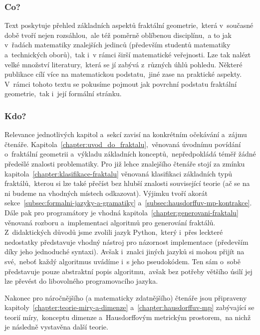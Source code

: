 \label{chapter:predmluva}

\subsubsection{Co?}

Text poskytuje přehled základních aspektů fraktální geometrie,~která v~současné době tvoří nejen rozsáhlou,~ale též poměrně oblíbenou disciplínu,~a to jak v~řadách matematiky znalejších jedinců (především studentů matematiky a~technických oborů),~tak i~v rámci širší matematické veřejnosti. Lze tak nalézt velké množství literatury,~která se jí zabývá z~různých úhlů pohledu. Některé publikace cílí více na matematickou podstatu,~jiné zase na praktické aspekty. V~rámci tohoto textu se pokusíme pojmout jak povrchní podstatu fraktální geometrie,~tak i~její formální stránku.

\subsubsection{Kdo?}

Relevance jednotlivých kapitol a~sekcí zavisí na konkrétním očekávání a~zájmu čtenáře. Kapitola~\ref{chapter:uvod_do_fraktalu},~věnovaná úvodnímu povídání o~fraktální geometrii a~výkladu základních konceptů,~nepředpokládá téměř žádné předešlé znalosti problematiky. Pro již lehce znalejšího čtenáře stojí za zmínku kapitola~\ref{chapter:klasifikace-fraktalu} věnovaná klasifikaci základních typů fraktálů,~kterou si lze také přečíst bez hlubší znalosti související teorie (ač se na ni budeme na vhodných místech odkazovat). Výjimku tvoří akorát sekce~\ref{subsec:formalni-jazyky-a-gramatiky} a~\ref{subsec:hausdorffuv-mp-kontrakce}. Dále pak pro programátory je vhodná kapitola~\ref{chapter:generovani-fraktalu} věnovaná rozboru a~implementaci algoritmů pro generování fraktálů. Z~didaktických důvodů jsme zvolili jazyk Python,~který i~přes leckteré nedostatky představuje vhodný nástroj pro názornost implementace (především díky jeho jednoduché syntaxi). Avšak i~znalci jiných jazyků si mohou přijít na své,~neboť každý algoritmus uvádíme i~s jeho pseudokódem. Ten sám o~sobě představuje pouze abstraktní popis algoritmu,~avšak bez potřeby většího úsilí jej lze převést do libovolného programovacího jazyka.

Nakonec pro náročnějšího (a matematicky zdatnějšího) čtenáře jsou připraveny kapitoly~\ref{chapter:teorie-miry-a-dimenze} a~\ref{chapter:hausdorffuv-mp} zabývající se teorií míry,~konceptu dimenze a~Hausdorffovým metrickým prostorem,~na nichž je následně vystavěna další teorie.


